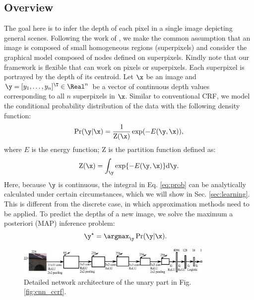\subsection{Overview}
The goal here is to infer the depth of each pixel in a single image depicting general scenes. 
Following the work of \cite{make3d_pami09,Liu_cvpr12,Miaomiao_cvpr14}, 
we make the common assumption that an image is composed of small homogeneous regions (superpixels)   
and consider the graphical model composed of nodes defined on superpixels.
Kindly note that our framework is flexible that can work on pixels or superpixels.
Each superpixel is portrayed by the depth of its centroid.
Let $\x$ be an image and $\y=[y_1,\ldots, y_n]^{\T} \in \Real^n$ be 
%
a vector of continuous depth values corresponding to
 all $n$ superpixels in $\x$. 
 Similar to conventional CRF,
 we model the conditional probability distribution of the data with the following density function:
%
\begin{equation}\label{eq:prob}
\begin{aligned}
\Pr(\y|\x) = \frac{1}{\mathrm{Z(\x)}} \exp (- E(\y, \x)),
\end{aligned}
\end{equation}
where $E$ is the energy function; $\mathrm{Z}$ is the partition function  defined as:
\begin{equation}\label{eq:partition}
\mathrm{Z}(\x) = \int_{\y} \exp \{ -E(\y, \x) \}\mathrm{d}\y.
\end{equation}
Here, because $\y$ is continuous, the integral in Eq. \eqref{eq:prob} can be analytically calculated under certain circumstances, which we will show in Sec. \ref{sec:learning}.
This is different from the discrete case, in which approximation methods need to be applied.  
To predict the depths of a new image, we solve the maximum a posteriori (MAP) inference problem: 
\begin{align} \label{eq:inference}
\y^{\star}&=\argmax_{\y} \Pr(\y|\x). 
\end{align} 




\begin{figure}[!t] \center
	\includegraphics[width=0.85\textwidth]{./fig/cnn_unary.pdf}
\caption{Detailed network architecture of the unary part in Fig. \ref{fig:cnn_ccrf}. }  \label{fig:cnn_unary}
\end{figure}




